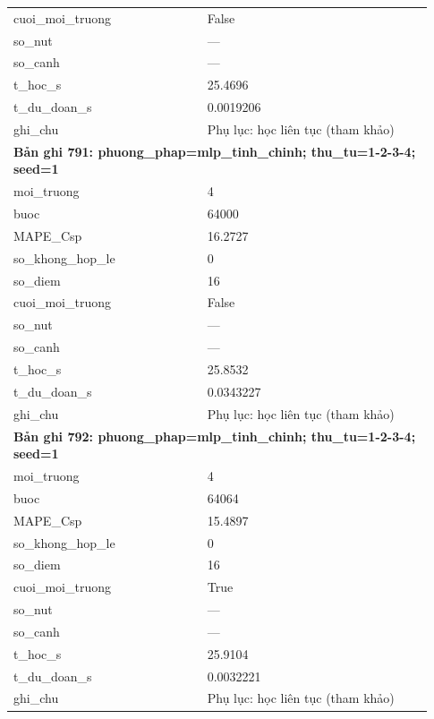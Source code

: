 \begin{longtable}{p{0.43\linewidth}p{0.50\linewidth}}
cuoi\_\allowbreak moi\_\allowbreak truong & False \\
so\_\allowbreak nut & — \\
so\_\allowbreak canh & — \\
t\_\allowbreak hoc\_\allowbreak s & 25.4696 \\
t\_\allowbreak du\_\allowbreak doan\_\allowbreak s & 0.0019206 \\
ghi\_\allowbreak chu & Phụ lục: học liên tục (tham khảo) \\
\midrule
\multicolumn{2}{p{0.95\linewidth}}{\textbf{Bản ghi 791: phuong\_phap=mlp\_tinh\_chinh; thu\_tu=1-2-3-4; seed=1}} \\
moi\_\allowbreak truong & 4 \\
buoc & 64000 \\
MAPE\_\allowbreak Csp & 16.2727 \\
so\_\allowbreak khong\_\allowbreak hop\_\allowbreak le & 0 \\
so\_\allowbreak diem & 16 \\
cuoi\_\allowbreak moi\_\allowbreak truong & False \\
so\_\allowbreak nut & — \\
so\_\allowbreak canh & — \\
t\_\allowbreak hoc\_\allowbreak s & 25.8532 \\
t\_\allowbreak du\_\allowbreak doan\_\allowbreak s & 0.0343227 \\
ghi\_\allowbreak chu & Phụ lục: học liên tục (tham khảo) \\
\midrule
\multicolumn{2}{p{0.95\linewidth}}{\textbf{Bản ghi 792: phuong\_phap=mlp\_tinh\_chinh; thu\_tu=1-2-3-4; seed=1}} \\
moi\_\allowbreak truong & 4 \\
buoc & 64064 \\
MAPE\_\allowbreak Csp & 15.4897 \\
so\_\allowbreak khong\_\allowbreak hop\_\allowbreak le & 0 \\
so\_\allowbreak diem & 16 \\
cuoi\_\allowbreak moi\_\allowbreak truong & True \\
so\_\allowbreak nut & — \\
so\_\allowbreak canh & — \\
t\_\allowbreak hoc\_\allowbreak s & 25.9104 \\
t\_\allowbreak du\_\allowbreak doan\_\allowbreak s & 0.0032221 \\
ghi\_\allowbreak chu & Phụ lục: học liên tục (tham khảo) \\

\end{longtable}
